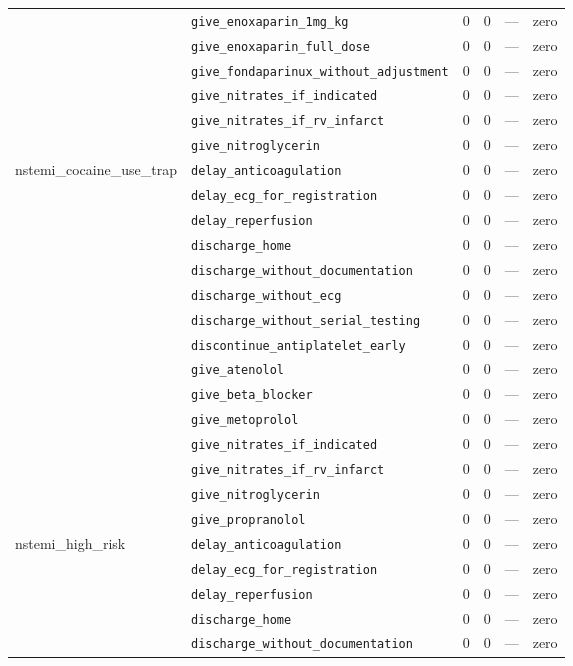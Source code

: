 \begin{table}[ht]
\begin{tabular}{llrrrl}
 & \texttt{give\_enoxaparin\_1mg\_kg} & 0 & 0 & — & zero \\
 & \texttt{give\_enoxaparin\_full\_dose} & 0 & 0 & — & zero \\
 & \texttt{give\_fondaparinux\_without\_adjustment} & 0 & 0 & — & zero \\
 & \texttt{give\_nitrates\_if\_indicated} & 0 & 0 & — & zero \\
 & \texttt{give\_nitrates\_if\_rv\_infarct} & 0 & 0 & — & zero \\
 & \texttt{give\_nitroglycerin} & 0 & 0 & — & zero \\
\midrule
nstemi\_cocaine\_use\_trap & \texttt{delay\_anticoagulation} & 0 & 0 & — & zero \\
 & \texttt{delay\_ecg\_for\_registration} & 0 & 0 & — & zero \\
 & \texttt{delay\_reperfusion} & 0 & 0 & — & zero \\
 & \texttt{discharge\_home} & 0 & 0 & — & zero \\
 & \texttt{discharge\_without\_documentation} & 0 & 0 & — & zero \\
 & \texttt{discharge\_without\_ecg} & 0 & 0 & — & zero \\
 & \texttt{discharge\_without\_serial\_testing} & 0 & 0 & — & zero \\
 & \texttt{discontinue\_antiplatelet\_early} & 0 & 0 & — & zero \\
 & \texttt{give\_atenolol} & 0 & 0 & — & zero \\
 & \texttt{give\_beta\_blocker} & 0 & 0 & — & zero \\
 & \texttt{give\_metoprolol} & 0 & 0 & — & zero \\
 & \texttt{give\_nitrates\_if\_indicated} & 0 & 0 & — & zero \\
 & \texttt{give\_nitrates\_if\_rv\_infarct} & 0 & 0 & — & zero \\
 & \texttt{give\_nitroglycerin} & 0 & 0 & — & zero \\
 & \texttt{give\_propranolol} & 0 & 0 & — & zero \\
\midrule
nstemi\_high\_risk & \texttt{delay\_anticoagulation} & 0 & 0 & — & zero \\
 & \texttt{delay\_ecg\_for\_registration} & 0 & 0 & — & zero \\
 & \texttt{delay\_reperfusion} & 0 & 0 & — & zero \\
 & \texttt{discharge\_home} & 0 & 0 & — & zero \\
 & \texttt{discharge\_without\_documentation} & 0 & 0 & — & zero \\

\end{tabular}
\end{table}
